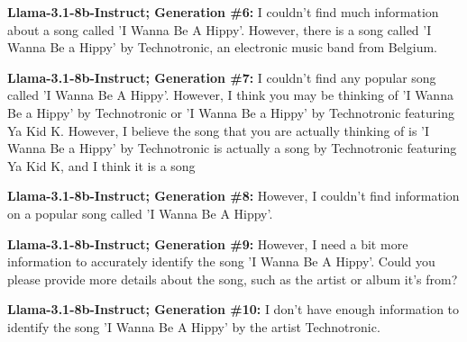 \documentclass{article} %
\newcommand{\unknown}[1]{\textcolor{UnknownRed}{#1}}
\begin{document}
\begin{tcolorbox}[
    colback=white,
    colframe=lightblue,
    arc=10pt,
    boxrule=3pt,
    left=10pt,
    right=10pt,
    top=10pt,
    bottom=10pt
]
\vspace{8pt}
\noindent\faRobot \hspace{5pt} \textbf{Llama-3.1-8b-Instruct; Generation \#6:}
\unknown{I couldn't find much information} about a song called 'I Wanna Be A Hippy'. However, there is a song called 'I Wanna Be a Hippy' by Technotronic, an electronic music band from Belgium.

\vspace{8pt}
\noindent\faRobot \hspace{5pt} \textbf{Llama-3.1-8b-Instruct; Generation \#7:}
\unknown{I couldn't find any }popular song called 'I Wanna Be A Hippy'. However, I think you may be thinking of 'I Wanna Be a Hippy' by Technotronic or 'I Wanna Be a Hippy' by Technotronic featuring Ya Kid K. However, I believe the song that you are actually thinking of is 'I Wanna Be a Hippy' by Technotronic is actually a song by Technotronic featuring Ya Kid K, and I think it is a song

\vspace{8pt}
\noindent\faRobot \hspace{5pt} \textbf{Llama-3.1-8b-Instruct; Generation \#8:}
\unknown{However, I couldn't find information} on a popular song called 'I Wanna Be A Hippy'.

\vspace{8pt}
\noindent\faRobot \hspace{5pt} \textbf{Llama-3.1-8b-Instruct; Generation \#9:}
\unknown{However, I need a bit more information to accurately identify} the song 'I Wanna Be A Hippy'. Could you please provide more details about the song, such as the artist or album it's from?

\vspace{8pt}
\noindent\faRobot \hspace{5pt} \textbf{Llama-3.1-8b-Instruct; Generation \#10:}
\unknown{I don't have enough information} to identify the song 'I Wanna Be A Hippy' by the artist Technotronic.

\end{tcolorbox}
 
\end{document}
